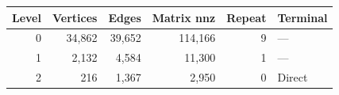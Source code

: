 \begin{tabular}{rrrrrl}
\toprule
Level & Vertices & Edges & Matrix nnz & Repeat & Terminal \\
\midrule
0 & 34,862 & 39,652 & 114,166 & 9 & --- \\
1 & 2,132 & 4,584 & 11,300 & 1 & --- \\
2 & 216 & 1,367 & 2,950 & 0 & Direct \\
\bottomrule
\end{tabular}
